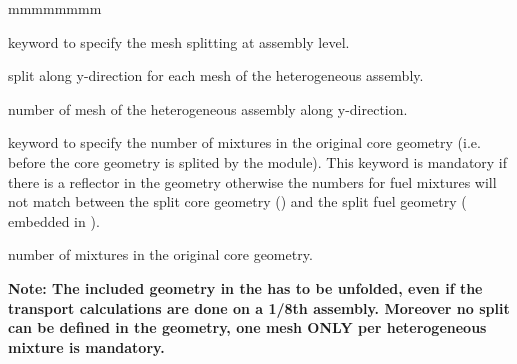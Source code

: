 \begin{ListeDeDescription}{mmmmmmmm}
\item[\moc{SLPITY-ASS}] keyword to specify the mesh splitting at assembly level. 

\item[\dusa{ispy}] split along y-direction for each mesh of the heterogeneous assembly. 

\item[\dusa{nyass}] number of mesh of the heterogeneous assembly along y-direction. 

\item[\moc{MAX-MIX-GEO}] keyword to specify the number of mixtures in the original core geometry (i.e. before the core geometry is splited by the  module). This keyword is mandatory if there is a reflector in the geometry otherwise the numbers for fuel mixtures will not match between the split core geometry () and the split fuel geometry ( embedded in ).

\item[\dusa{nmxgeo}] number of mixtures in the original core geometry. 

\end{ListeDeDescription}

{\bf Note: The included geometry in the  has to be unfolded, even if the transport calculations are done on a 1/8th assembly. Moreover no split can be defined in the geometry, one mesh ONLY per heterogeneous mixture  is mandatory.} 

\eject
